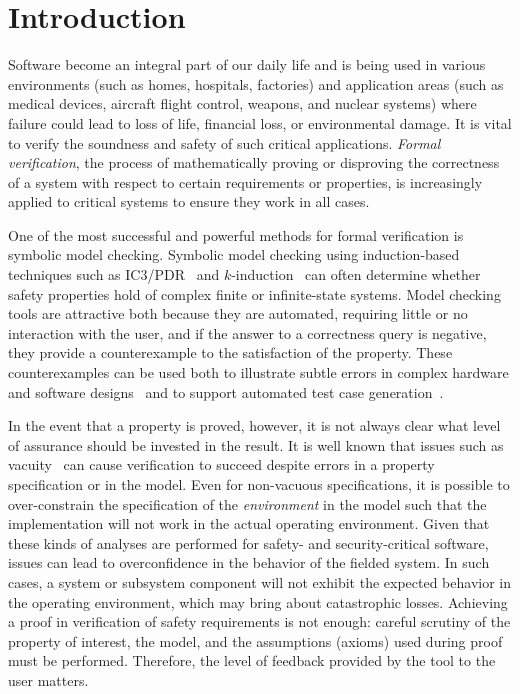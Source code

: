 \chapter{Introduction}
\label{ch:intro}
Software become an integral part of our daily life and is being used in various environments (such as homes, hospitals, factories) and application areas (such as medical devices, aircraft flight control, weapons, and nuclear systems) where failure could lead to loss of life, financial loss, or environmental damage. It is vital to verify the soundness and safety of such critical applications. \emph{Formal verification}, the process of mathematically proving or disproving the correctness of a system with respect to certain requirements or properties, is increasingly applied to critical systems to ensure they work in all cases.

One of the most successful and powerful methods for formal verification is symbolic model checking. Symbolic model checking using induction-based techniques such as IC3/PDR~\cite{Een2011:PDR} and $k$-induction~\cite{SheeranSS00} can often determine whether safety properties hold of complex finite or infinite-state systems.  Model checking tools are attractive both because they are automated, requiring little or no interaction with the user, and if the answer to a correctness query is negative, they provide a counterexample to the satisfaction of the property.  These counterexamples can be used both to illustrate subtle errors in complex hardware and software designs~\cite{hilt2013,McMillan99:compositional, Miller10:CACM} and to support automated test case generation~\cite{Whalen13:OMCDC, You15:dse}.

In the event that a property is proved, however, it is not always clear what level of assurance should be invested in the result. It is well known that issues such as vacuity~\cite{Kupferman03:Vacuity} can cause verification to succeed despite errors in a property specification or in the model. 
Even for non-vacuous specifications, it is possible to over-constrain the specification of the {\em environment} in the model such that the implementation will not work in the actual operating environment. 
Given that these kinds of analyses are performed for safety- and security-critical software, issues can lead to overconfidence in the behavior of the fielded system.
In such cases, a system or subsystem component will not exhibit the expected behavior in the operating environment, which may bring about catastrophic losses. Achieving a proof in verification of safety requirements is not enough: careful scrutiny of the property of interest, the model, and the assumptions (axioms) used during proof must be performed.  Therefore, the level of feedback provided by the tool to the user matters.

